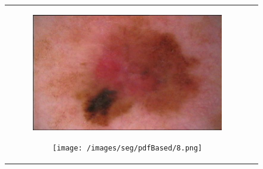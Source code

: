 \documentclass[a4paper, 10pt, conference]{ieeeconf}        %
\begin{document}
\begin{figure}[ht!]
\begin{tabular}{c c}
 \begin{subfigure}{0.2\textwidth}
  \includegraphics[scale=0.15]{original08.JPG}\caption{}
  \end{subfigure}
  \begin{subfigure}{0.2\textwidth}
  \texttt{[image: /images/seg/pdfBased/8.png]}\caption{}
  \end{subfigure}\\    
 \end{tabular}
 \end{figure}
\clearpage
\end{document}

